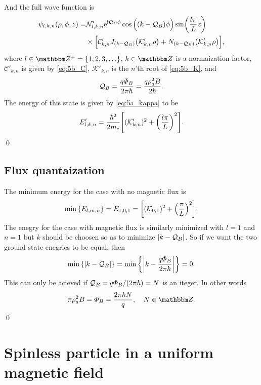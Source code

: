 \documentclass[11pt,letter, swedish, english
]{article}
\begin{document}
And the full wave function is
\begin{equation}
\begin{aligned}
\psi_{l,k,n}(\rho, \phi, z)=&
\mathcal{N}'_{l,k,n}\mathrm{e}^{\mathrm{i}\mathcal{Q}_B\phi}\cos\Big((k-\mathcal{Q}_B)\phi\Big)
\sin(\frac{l\pi}{L}z)\\
&\times
\Big[\mathcal{C}'_{k,n}J_{(k-\mathcal{Q}_B)}\qty(\mathcal{K}'_{k,n}\rho)+
N_{(k-\mathcal{Q}_B)}\qty(\mathcal{K}'_{k,n}\rho) \Big],
\end{aligned}
\end{equation}
where $l\in\Z^+=\{1, 2, 3,\ldots\}$, $k\in\Z$ is a normaization factor, 
$\mathcal{C}'_{k,n}$ is given by \eqref{eq:5b_C}, 
$\mathcal{K}'_{k,n}$ is the $n$'th root of \eqref{eq:5b_K},
and 
\begin{equation}
\mathcal{Q}_B=\frac{q\varPhi_B}{2\pi\hbar}
=\frac{q \rho_a^2 B}{2\hbar}.
\end{equation}
The energy of this state is given by \eqref{eq:5a_kappa} to be
\begin{equation}
E'_{l,k,n}=\frac{\hbar^2}{2m_e}\qty[(\mathcal{K}'_{k,n})^2 + \qty(\frac{l\pi}{L})^2].
\end{equation}
\qed


\subsection{Flux quantaization}
The minimum energy for the case with no magnetic flux is
\begin{equation}
\min\qty{E_{l,m,n}}=E_{1,0,1}
=\qty[(\mathcal{K}_{0,1})^2 + \qty(\frac{\pi}{L})^2].
\end{equation}
The enegry for the case with magnetic flux is similarly minimized with
$l=1$ and $n=1$ but $k$ should be choosen so as to minimize
$|k-\mathcal{Q}_B|$. So if we want the two ground state enegries to be equal,
then
\begin{equation}
\min\qty{\abs{k-\ensuremath{\mathcal{Q}_B}}}
=\min\qty{\abs{k-\frac{q\varPhi_B}{2\pi\hbar}}}=0.
\end{equation}
This can only be acieved if $\mathcal{Q}_B=q\varPhi_B/(2\pi\hbar)=N$ is an
iteger. In other words
\begin{equation}
\pi\rho_a^2B=\varPhi_B=\frac{2\pi\hbar N}{q}\qcomma N\in\Z.
\end{equation}
\qed





\section{Spinless particle in a uniform magnetic field}
\end{document}
